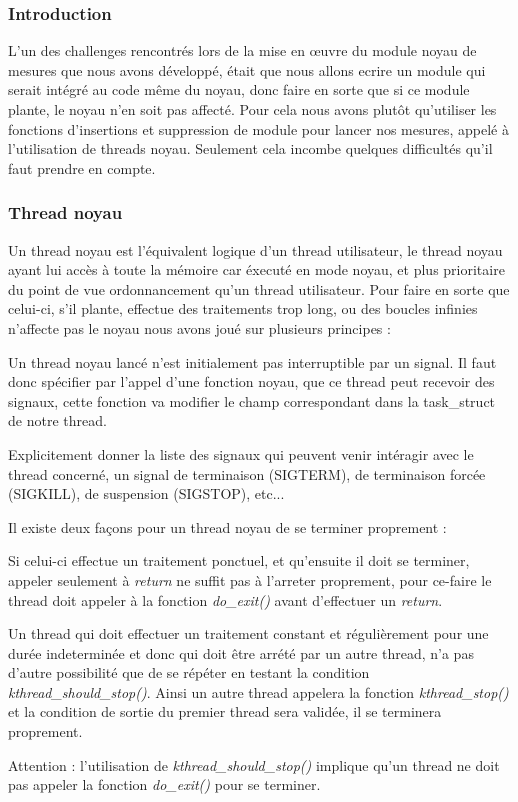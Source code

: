 					\subsubsection{Introduction}
						L'un des challenges rencontrés lors de la mise en \oe uvre du module noyau de mesures que nous avons développé, était que nous allons ecrire un module qui serait intégré au code même du noyau, donc faire en sorte que si ce module plante, le noyau n'en soit pas affecté. Pour cela nous avons plutôt qu'utiliser les fonctions d'insertions et suppression de module pour lancer nos mesures, appelé à l'utilisation de threads noyau. Seulement cela incombe quelques difficultés qu'il faut prendre en compte.
					\subsubsection{Thread noyau}
						Un thread noyau est l'équivalent logique d'un thread utilisateur, le thread noyau ayant lui accès à toute la mémoire car éxecuté en mode noyau, et plus prioritaire du point de vue ordonnancement qu'un thread utilisateur. Pour faire en sorte que celui-ci, s'il plante, effectue des traitements trop long, ou des boucles infinies n'affecte pas le noyau nous avons joué sur plusieurs principes : 
						\bitem
							\item{Un thread noyau lancé n'est initialement pas interruptible par un signal. Il faut donc spécifier par l'appel d'une fonction noyau, que ce thread peut recevoir des signaux, cette fonction va modifier le champ correspondant dans la task\_struct de notre thread.}
							\item{Explicitement donner la liste des signaux qui peuvent venir intéragir avec le thread concerné, un signal de terminaison (SIGTERM), de terminaison forcée (SIGKILL), de suspension (SIGSTOP), etc...}
							\item{Il existe deux façons pour un thread noyau de se terminer proprement :
								\bitem
									\item{Si celui-ci effectue un traitement ponctuel, et qu'ensuite il doit se terminer, appeler seulement à \emph{return} ne suffit pas à l'arreter proprement, pour ce-faire le thread doit appeler à la fonction \emph{do\_exit()} avant d'effectuer un \emph{return}.}
									\item{Un thread qui doit effectuer un traitement constant et régulièrement pour une durée indeterminée et donc qui doit être arrété par un autre thread, n'a pas d'autre possibilité que de se répéter en testant la condition \emph{kthread\_should\_stop()}. Ainsi un autre thread appelera la fonction \emph{kthread\_stop()} et la condition de sortie du premier thread sera validée, il se terminera proprement.}
									\item{Attention : l'utilisation de \emph{kthread\_should\_stop()} implique qu'un thread ne doit pas appeler la fonction \emph{do\_exit()} pour se terminer.}
								\eitem 
							}
